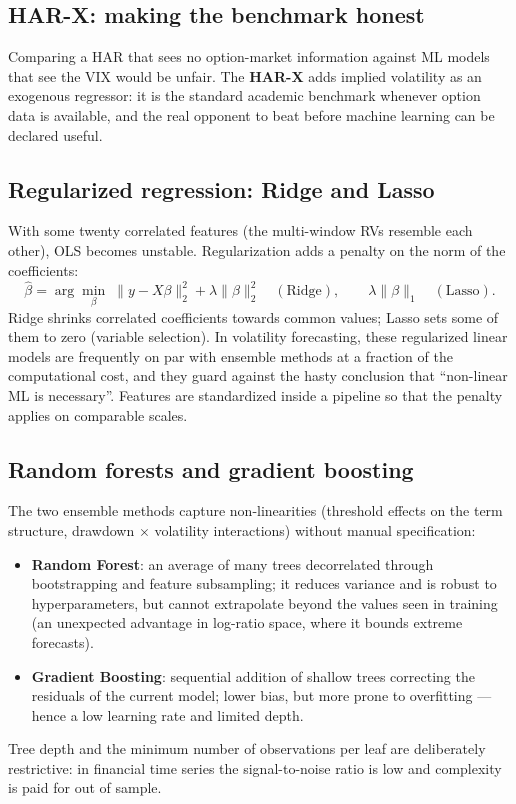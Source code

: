 \documentclass[11pt,a4paper]{article}
\begin{document}
\subsection{HAR-X: making the benchmark honest}

Comparing a HAR that sees no option-market information against ML models that
see the VIX would be unfair. The \textbf{HAR-X} adds implied volatility as an
exogenous regressor: it is the standard academic benchmark whenever option
data is available, and the real opponent to beat before machine learning can
be declared useful.

\subsection{Regularized regression: Ridge and Lasso}

With some twenty correlated features (the multi-window RVs resemble each
other), OLS becomes unstable. Regularization adds a penalty on the norm of
the coefficients:
\begin{equation}
\hat{\beta} = \arg\min_\beta\; \|y - X\beta\|_2^2
+ \lambda \|\beta\|_2^2 \quad (\text{Ridge}), \qquad
\lambda \|\beta\|_1 \quad (\text{Lasso}).
\end{equation}
Ridge shrinks correlated coefficients towards common values; Lasso sets some
of them to zero (variable selection). In volatility forecasting, these
regularized linear models are frequently on par with ensemble methods at a
fraction of the computational cost, and they guard against the hasty
conclusion that ``non-linear ML is necessary''. Features are standardized
inside a pipeline so that the penalty applies on comparable scales.

\subsection{Random forests and gradient boosting}

The two ensemble methods capture non-linearities (threshold effects on the
term structure, drawdown $\times$ volatility interactions) without manual
specification:
\begin{itemize}
\item \textbf{Random Forest}: an average of many trees decorrelated through
  bootstrapping and feature subsampling; it reduces variance and is robust to
  hyperparameters, but cannot extrapolate beyond the values seen in training
  (an unexpected advantage in log-ratio space, where it bounds extreme
  forecasts).
\item \textbf{Gradient Boosting}: sequential addition of shallow trees
  correcting the residuals of the current model; lower bias, but more prone
  to overfitting --- hence a low learning rate and limited depth.
\end{itemize}
Tree depth and the minimum number of observations per leaf are deliberately
restrictive: in financial time series the signal-to-noise ratio is low and
complexity is paid for out of sample.
\end{document}
